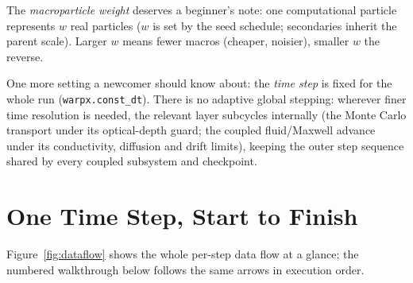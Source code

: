 \documentclass[11pt]{article}
\DeclareRobustCommand{\code}[1]{\ifmmode\text{\ttfamily#1}\else\nolinkurl{#1}\fi}
\begin{document}
The \emph{macroparticle weight} deserves a beginner's note: one
computational particle represents $w$ real particles ($w$ is set by the
seed schedule; secondaries inherit the parent scale). Larger $w$ means
fewer macros (cheaper, noisier), smaller $w$ the reverse.

One more setting a newcomer should know about: the \emph{time step} is
fixed for the whole run (\code{warpx.const\_dt}). There is no adaptive global
stepping: wherever finer time
resolution is needed, the relevant layer subcycles internally (the Monte
Carlo transport under its optical-depth guard; the coupled fluid/Maxwell
advance under its conductivity, diffusion and drift limits), keeping the
outer step sequence shared by every coupled subsystem and checkpoint.

\section{One Time Step, Start to Finish}
\label{sec:step}

Figure~\ref{fig:dataflow} shows the whole per-step data flow at a glance;
the numbered walkthrough below follows the same arrows in execution order.
\end{document}
